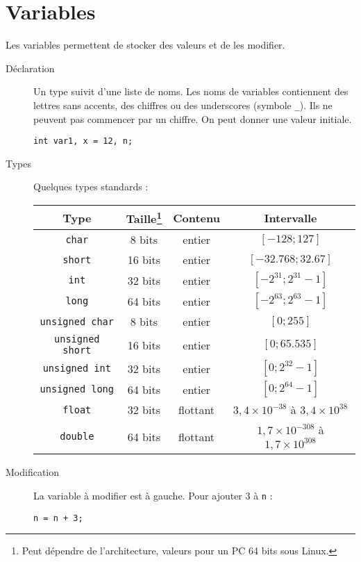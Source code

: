 \documentclass[a4paper,10pt]{article}
\begin{document}
  \section{Variables}
  Les variables permettent de stocker des valeurs et de les modifier.
  \begin{description}
    \item[Déclaration] Un type suivit d'une liste de noms. Les noms de variables contiennent des lettres sans accents, des chiffres ou des underscores (symbole \texttt{\_}). Ils ne peuvent pas commencer par un chiffre. On peut donner une valeur initiale.
      \begin{verbatim}
int var1, x = 12, n;
      \end{verbatim}
    \item[Types] Quelques types standards :\\
      \begin{tabu}{c|c|c|c}
        Type & Taille\footnote{Peut dépendre de l'architecture, valeurs pour un PC 64 bits sous Linux.} & Contenu & Intervalle\\
        \hline
        \texttt{char} & 8 bits & entier & $[- 128; 127]$\\
        \texttt{short} & 16 bits & entier & $[-32.768; 32 .67]$\\
        \texttt{int} & 32 bits & entier & $[- 2^{31}; 2^{31} - 1]$\\
        \texttt{long} & 64 bits & entier & $[- 2^{63}; 2^{63} - 1]$\\
        \hline
        \texttt{unsigned char} & 8 bits & entier & $[0; 255]$\\
        \texttt{unsigned short} & 16 bits & entier & $[0; 65.535]$\\
        \texttt{unsigned int} & 32 bits & entier & $[0; 2^{32} - 1]$\\
        \texttt{unsigned long} & 64 bits & entier & $[0; 2^{64} - 1]$\\
        \hline
        \texttt{float} & 32 bits & flottant & $3,4 \times 10^{-38}$ à $3,4 \times 10^{38}$\\
        \texttt{double} & 64 bits & flottant & $1,7 \times 10^{-308}$ à $1,7 \times 10^{308}$
      \end{tabu}
    \item[Modification] La variable à modifier est à gauche. Pour ajouter 3 à \texttt{n} :
      \begin{verbatim}
n = n + 3;
      \end{verbatim}
  \end{description}
  
\end{document}
